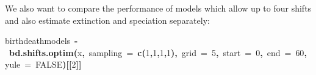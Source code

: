 \documentclass[authoryear, preprint]{elsarticle}
\makeatletter
\newcommand{\hlnumber}[1]{\textcolor[rgb]{0,0,0}{#1}}%
\newcommand{\hlfunctioncall}[1]{\textcolor[rgb]{.5,0,.33}{\textbf{#1}}}%
\newcommand{\hlkeyword}[1]{\textbf{#1}}%
\newcommand{\hlargument}[1]{\textcolor[rgb]{.69,.25,.02}{#1}}%
\newcommand{\hlassignement}[1]{\textbf{#1}}%
\newcommand{\hlsymbol}[1]{#1}%
\newenvironment{kframe}{%
 \def\FrameCommand##1{\hskip\@totalleftmargin \hskip-\fboxsep
 \colorbox{shadecolor}{##1}\hskip-\fboxsep
     \hskip-\linewidth \hskip-\@totalleftmargin \hskip\columnwidth}%
 \MakeFramed {\advance\hsize-\width
   \@totalleftmargin\z@ \linewidth\hsize
   \@setminipage}}%
 {\par\unskip\endMakeFramed}
\newenvironment{knitrout}{}{} %
\makeatother
\begin{document}
  
We also want to compare the performance of models which allow up to four shifts and also 
estimate extinction and speciation separately:


\begin{knitrout}
\color{fgcolor}\begin{kframe}
\begin{flushleft}
\ttfamily\noindent
\hlsymbol{birth\usebox{\hlnormalsizeboxunderscore}death\usebox{\hlnormalsizeboxunderscore}models}{\ }\hlassignement{\usebox{\hlnormalsizeboxlessthan}-}{\ }\hlfunctioncall{bd.shifts.optim}\hlkeyword{(}\hlsymbol{x}\hlkeyword{,}{\ }\hlargument{sampling}{\ }\hlargument{=}{\ }\hlfunctioncall{c}\hlkeyword{(}\hlnumber{1}\hlkeyword{,}\hlnumber{1}\hlkeyword{,}\hlnumber{1}\hlkeyword{,}\hlnumber{1}\hlkeyword{)}\hlkeyword{,}{\ }\hlargument{grid}{\ }\hlargument{=}{\ }\hlnumber{5}\hlkeyword{,}{\ }\hlargument{start}{\ }\hlargument{=}{\ }\hlnumber{0}\hlkeyword{,}{\ }\hlargument{end}{\ }\hlargument{=}{\ }\hlnumber{60}\hlkeyword{,}{\ }\hlargument{yule}{\ }\hlargument{=}{\ }\hlnumber{FALSE}\hlkeyword{)}\hlkeyword{[[}\hlnumber{2}\hlkeyword{]}\hlkeyword{]}\mbox{}
\normalfont
\end{flushleft}
\end{kframe}
\end{knitrout}
\end{document}

